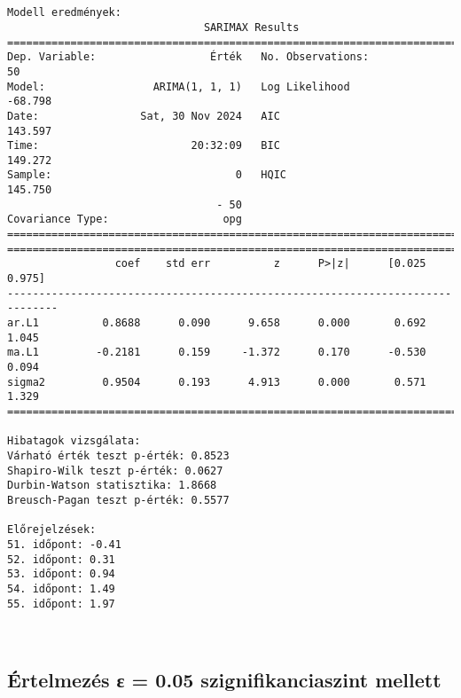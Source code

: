 \documentclass[11pt]{article}
\begin{document}
    \begin{center}
    \end{center}
    { \hspace*{\fill} \\}
    
    \begin{Verbatim}[commandchars=\\\{\}]

Modell eredmények:
                               SARIMAX Results
==============================================================================
Dep. Variable:                  Érték   No. Observations:                   50
Model:                 ARIMA(1, 1, 1)   Log Likelihood                 -68.798
Date:                Sat, 30 Nov 2024   AIC                            143.597
Time:                        20:32:09   BIC                            149.272
Sample:                             0   HQIC                           145.750
                                 - 50
Covariance Type:                  opg
==============================================================================
==============================================================================
                 coef    std err          z      P>|z|      [0.025      0.975]
------------------------------------------------------------------------------
ar.L1          0.8688      0.090      9.658      0.000       0.692       1.045
ma.L1         -0.2181      0.159     -1.372      0.170      -0.530       0.094
sigma2         0.9504      0.193      4.913      0.000       0.571       1.329
==============================================================================

Hibatagok vizsgálata:
Várható érték teszt p-érték: 0.8523
Shapiro-Wilk teszt p-érték: 0.0627
Durbin-Watson statisztika: 1.8668
Breusch-Pagan teszt p-érték: 0.5577

Előrejelzések:
51. időpont: -0.41
52. időpont: 0.31
53. időpont: 0.94
54. időpont: 1.49
55. időpont: 1.97
    \end{Verbatim}

    \begin{center}
    \end{center}
    { \hspace*{\fill} \\}
    
    \subsection{Értelmezés ε = 0.05 szignifikanciaszint
mellett}\label{uxe9rtelmezuxe9s-ux3b5-0.05-szignifikanciaszint-mellett}
\end{document}
